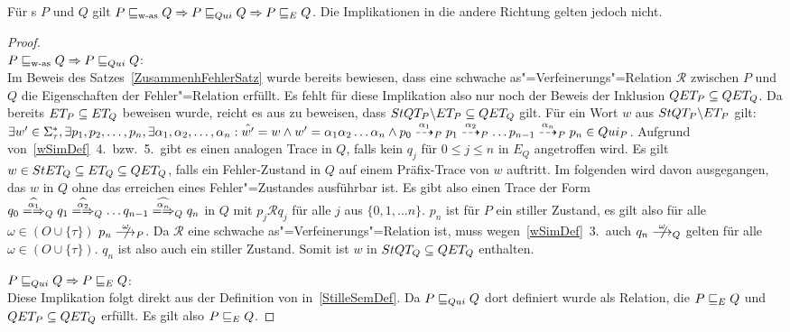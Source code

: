 \begin{Satz}
  \label{ZusammenhStilleSatz}
  Für \MEIO{}s $P$ und $Q$ gilt $P \sqsubseteq _{\mathrm{w}\text{-}\mathrm{as}} Q \Rightarrow P  \sqsubseteq  _{Qui} Q \Rightarrow
  P  \sqsubseteq  _E Q$. Die Implikationen in die andere Richtung gelten jedoch nicht.
\end{Satz}
\begin{proof}\mbox{}\\
  $P \sqsubseteq _{\mathrm{w}\text{-}\mathrm{as}} Q \Rightarrow P  \sqsubseteq  _{Qui} Q$:\\
  Im Beweis des Satzes~\ref{ZusammenhFehlerSatz} wurde bereits bewiesen, dass
  eine schwache as"=Verfeinerungs"=Relation $\mathcal{R}$ zwischen $P$ und $Q$
  die Eigenschaften der Fehler"=Relation \ERel{} erfüllt. Es fehlt für diese
  Implikation also nur noch der Beweis der Inklusion $QET _P \subseteq QET
  _Q$. Da bereits $ET _P\subseteq ET _Q$ beweisen wurde, reicht es aus zu
  beweisen, dass $StQT _P \backslash ET _P\subseteq QET _Q$ gilt. Für ein
  Wort $w$ aus $StQT _P \backslash ET _P$ gilt: $\exists w'\in\Sigma _{\tau}
  ^*, \exists p_1, p_2, \dots , p_n, \exists \alpha _1, \alpha _2, \dots
  ,\alpha _n: \hat{w'} = w \land w' = \alpha _1\alpha _2\dots\alpha _n \land
  p_0 \may[\alpha _1]_P p_1 \may[\alpha _2]_P \dots p_{n-1} \may[\alpha _n]_P
  p_n \in Qui _P$. Aufgrund von~\ref{wSimDef}~4.\ bzw.~5.\ gibt es einen
  analogen Trace in $Q$, falls kein $q_j$ für $0\leq j \leq n$ in $E_Q$
  angetroffen wird. Es gilt $w\in StET _Q\subseteq ET _Q\subseteq QET _Q$,
  falls ein Fehler-Zustand in $Q$ auf einem Präfix-Trace von $w$ auftritt. Im
  folgenden wird davon ausgegangen, das $w$ in $Q$ ohne das erreichen eines
  Fehler"=Zustandes ausführbar ist. Es gibt also einen Trace der Form $q_0
  \weakmay[\widehat{\alpha _1}]_Q q_1 \weakmay[\widehat{\alpha _2}]_Q \dots
  q_{n-1} \weakmay[\widehat{\alpha _n}]_Q q_n$ in $Q$ mit $p_j \mathcal{R} q_j$
  für alle $j$ aus $\{0,1,\dots n\}$. $p_n$ ist für $P$ ein stiller Zustand, es
  gilt also für alle $\omega \in (O\cup \{\tau\})$ $p_n \nmust[\omega]_P$. Da
  $\mathcal{R}$ eine schwache as"=Verfeinerungs"=Relation ist, muss
  wegen~\ref{wSimDef}~3.\ auch $q_n \nmust[\omega]_Q$ gelten für alle $\omega
  \in (O\cup \{\tau\})$. $q_n$ ist also auch ein stiller Zustand. Somit ist $w$
  in $StQT _Q\subseteq QET _Q$ enthalten.

  $P  \sqsubseteq  _{Qui} Q \Rightarrow P  \sqsubseteq  _E Q$:\\
  Diese Implikation folgt direkt aus der Definition von \QRel{}
  in~\ref{StilleSemDef}. Da $P  \sqsubseteq  _{Qui} Q$ dort definiert wurde als Relation, die
  $P  \sqsubseteq  _E Q$ und $QET _P \subseteq QET _Q$ erfüllt. Es gilt also $P  \sqsubseteq  _E Q$.


\end{proof}
